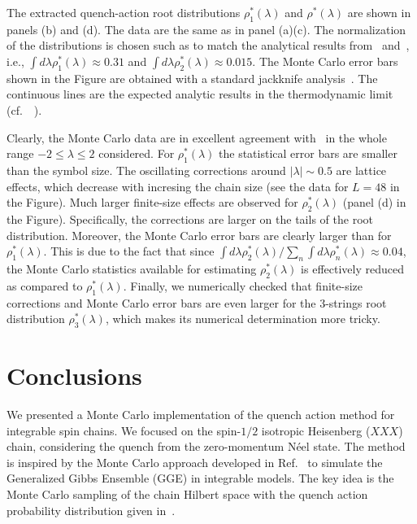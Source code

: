\documentclass[11pt]{iopart}
\begin{document}
The extracted quench-action root distributions $\rho^*_1(\lambda)$ and $\rho^*(\lambda)$ 
are shown in panels (b) and (d). The data are the same as in panel (a)(c). The normalization 
of the distributions is chosen such as to match the analytical results from~ 
and~, i.e., $\int d\lambda\rho^*_1(\lambda)\approx0.31$ and $\int d\lambda
\rho^*_2(\lambda)\approx0.015$. The Monte Carlo error bars shown in the Figure are obtained 
with a standard jackknife analysis~\cite{quenouille-1949,wolff-2004}. 
The continuous lines are the expected analytic results in the thermodynamic limit 
(cf.~~). 

Clearly, the Monte Carlo data are in excellent agreement with~ in the whole 
range $-2\le\lambda\le2$ considered. For $\rho^*_1(\lambda)$ the statistical error bars 
are smaller than the symbol size. The oscillating corrections around $|\lambda|\sim0.5$ 
are lattice effects, which decrease with incresing the chain size 
(see the data for $L=48$ in the Figure). Much larger finite-size effects are observed for 
$\rho^*_2(\lambda)$ (panel (d) in the Figure). Specifically, the corrections are larger on 
the tails of the root distribution. Moreover, the Monte Carlo error bars are clearly 
larger than for $\rho_1^*(\lambda)$. This is due to the fact that since $\int d\lambda
\rho^*_2(\lambda)/\sum_n\int d\lambda\rho_n^*(\lambda)\approx 0.04$, the Monte Carlo 
statistics available for estimating $\rho_2^*(\lambda)$ is effectively reduced as 
compared to $\rho_1^*(\lambda)$. Finally, we numerically checked that finite-size 
corrections and Monte Carlo error bars are even larger for the $3$-strings root 
distribution $\rho^*_3(\lambda)$, which makes its numerical determination more 
tricky. 

\section{Conclusions}
\label{conclusions}

We presented a Monte Carlo implementation of the quench action method for integrable 
spin chains. We focused on the spin-$1/2$ isotropic Heisenberg ($XXX$) chain, considering  
the quench from the zero-momentum N\'eel state. The method is inspired by the Monte Carlo 
approach developed in Ref.~\cite{alba-2015} to simulate the Generalized Gibbs Ensemble 
(GGE) in integrable models. The key idea is the Monte Carlo sampling of the chain Hilbert 
space with the quench action probability distribution given in~. 
\end{document}
